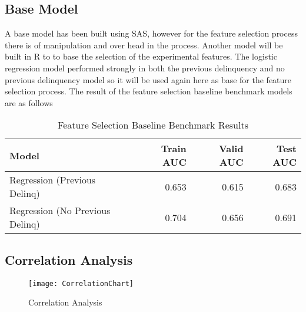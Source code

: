 \subsection{Base Model}
A base model has been built using SAS, however for the feature selection process there is of manipulation and over head in the process. Another model will be built in R to to base the selection of the experimental features. The logistic regression model performed strongly in both the previous delinquency and no previous delinquency model so it will be used again here as base for the feature selection process. The result of the feature selection baseline benchmark models are as follows 

\begin{table}[H]
	\centering
	\begin{tabular}{l | r | r| r}
		\hline
		\textbf{Model} & \textbf{Train AUC} & \textbf{Valid AUC} &  \textbf{Test AUC} \\
		\hline
		Regression (Previous Delinq) & 0.653 & 0.615 & 0.683  \\
		Regression (No Previous Delinq) & 0.704 & 0.656 & 0.691  \\
		\hline
	\end{tabular}
	\caption{Feature Selection Baseline Benchmark Results}
	\label{table:featureselection_base_model}
\end{table}

\subsection{Correlation Analysis}



\begin{figure}[H]
	\texttt{[image: CorrelationChart]}
	\caption{Correlation Analysis}
	\label{fig:Correlation Analysis}
\end{figure}

